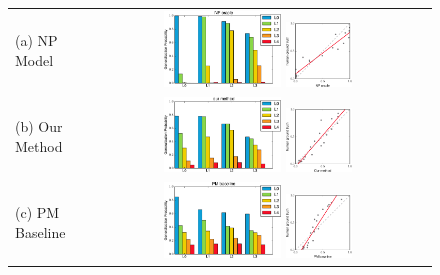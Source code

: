 \begin{figure}
    \centering
    \begin{tabular}{lc}
        (a) NP Model & \includegraphics[width=0.35\textwidth]{figs/vcl/per_level_response_np.pdf}
        \includegraphics[width=0.2\textwidth]{figs/vcl/correlation_np.pdf}\\
        (b) Our Method & \includegraphics[width=0.35\textwidth]{figs/vcl/per_level_response_vg.pdf}
        \includegraphics[width=0.2\textwidth]{figs/vcl/correlation_vg.pdf}\\
        (c) PM Baseline & \includegraphics[width=0.35\textwidth]{figs/vcl/per_level_response_pm.pdf}
        \includegraphics[width=0.2\textwidth]{figs/vcl/correlation_pm.pdf} \\

\end{tabular}
\end{figure}
